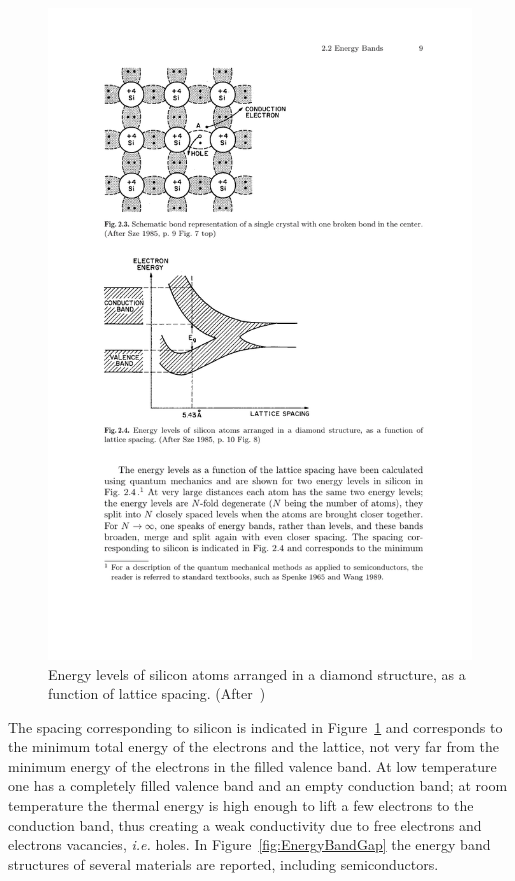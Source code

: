 \begin{figure}[htbp]
   \centering
   \includegraphics{EnergyLevels.pdf} %
   \caption{\label{fig:EnergyLevels}Energy levels of silicon atoms arranged in a diamond structure, as a function of lattice spacing. (After~\cite{Lutz:411172})}
\end{figure}

The spacing corresponding to silicon is indicated in Figure~\ref{fig:EnergyLevels} and corresponds to 
the minimum total energy of the electrons and the lattice, not very far from the minimum energy of
 the electrons in the filled valence band. 
 At low temperature one has a completely filled valence band and an empty conduction band; at room 
 temperature the thermal energy is high enough to lift a few electrons to the conduction band, thus 
 creating a weak conductivity due to free electrons and electrons vacancies, {\it i.e.} holes.
In Figure~\ref{fig:EnergyBandGap} the energy band structures of several materials are reported, 
including semiconductors.

